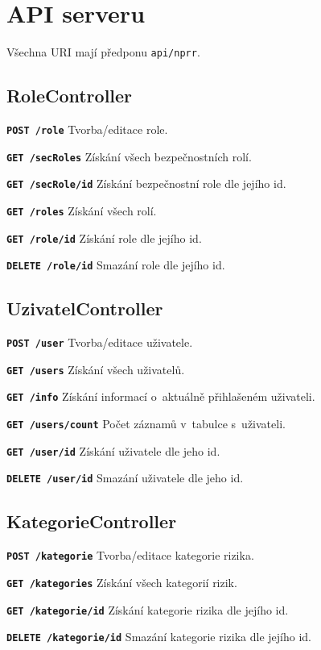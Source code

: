 \chapter{API serveru}

Všechna URI mají předponu \texttt{api/nprr}.

\section{RoleController}
\begin{DESCRIPTION}
    \item \texttt{\textbf{POST /role}} Tvorba/editace role.
    \item \texttt{\textbf{GET /secRoles}} Získání všech bezpečnostních rolí.
    \item \texttt{\textbf{GET /secRole/{id}}} Získání bezpečnostní role dle jejího id.
    \item \texttt{\textbf{GET /roles}} Získání všech rolí.
    \item \texttt{\textbf{GET /role/{id}}} Získání role dle jejího id.
    \item \texttt{\textbf{DELETE /role/{id}}} Smazání role dle jejího id.
\end{DESCRIPTION}

\section{UzivatelController}
\begin{DESCRIPTION}
\item \texttt{\textbf{POST /user}} Tvorba/editace uživatele.
\item \texttt{\textbf{GET /users}} Získání všech uživatelů.
\item \texttt{\textbf{GET /info}} Získání informací o~aktuálně přihlašeném uživateli.
\item \texttt{\textbf{GET /users/count}} Počet záznamů v~tabulce s~uživateli.
\item \texttt{\textbf{GET /user/{id}}} Získání uživatele dle jeho id.
\item \texttt{\textbf{DELETE /user/{id}}} Smazání uživatele dle jeho id.
\end{DESCRIPTION}

\section{KategorieController}
\begin{DESCRIPTION}
\item \texttt{\textbf{POST /kategorie}} Tvorba/editace kategorie rizika.
\item \texttt{\textbf{GET /kategories}} Získání všech kategorií rizik.
\item \texttt{\textbf{GET /kategorie/{id}}} Získání kategorie rizika dle jejího id.
\item \texttt{\textbf{DELETE /kategorie/{id}}} Smazání kategorie rizika dle jejího id.
\end{DESCRIPTION}

